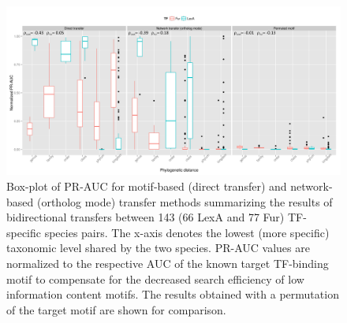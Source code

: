 \begin{figure}
  \centering
  \includegraphics[width=\textwidth]{figures/chapter3/phylogenetic-distance}
  \caption[Box-plot of PR-AUC for motif-based (direct transfer) and
  network-based (ortholog mode) transfer methods.]{Box-plot of PR-AUC for
    motif-based (direct transfer) and network-based (ortholog mode) transfer
    methods summarizing the results of bidirectional transfers between 143 (66
    LexA and 77 Fur) TF-specific species pairs. The x-axis denotes the lowest
    (more specific) taxonomic level shared by the two species. PR-AUC values
    are normalized to the respective AUC of the known target TF-binding motif
    to compensate for the decreased search efficiency of low information
    content motifs. The results obtained with a permutation of the target motif
    are shown for comparison.}
\label{fig:phylogenetic-distance}
\end{figure}

